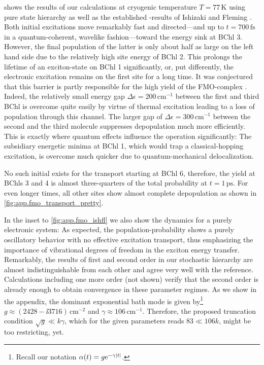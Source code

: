  shows the results of our calculations at cryogenic temperature $T=77\,\mathrm{K}$ using pure state hierarchy as well as the established \HEOM-results of Ishizaki and Fleming \cite{IsFl09_fmo}.
Both initial excitations move remarkably fast and directed---and up to $t=700\,\mathrm{fs}$ in a quantum-coherent, wavelike fashion---toward the energy sink at BChl 3.
However, the final population of the latter is only about half as large on the left hand side due to the relatively high site energy of BChl 2.
This prolongs the lifetime of an exciton-state on BChl 1 significantly, or, put differently, the electronic excitation remains on the first site for a long time.
It was conjectured that this barrier is partly responsible for the high yield of the FMO-complex \cite{IsFl09_fmo}.
Indeed, the relatively small energy gap $\Delta\epsilon = 200\, \mathrm{cm^{-1}}$ between the first and third BChl is overcome quite easily by virtue of thermal excitation leading to a loss of population through this channel.
The larger gap of $\Delta\epsilon = 300\,\mathrm{cm^{-1}}$ between the second and the third molecule suppresses depopulation much more efficiently.
This is exactly where quantum effects influence the operation significantly:
The subsidiary energetic minima at BChl 1, which would trap a classical-hopping excitation, is overcome much quicker due to quantum-mechanical delocalization.

No such initial  exists for the transport starting at BChl 6, therefore, the yield at BChls 3 and 4 is almost three-quarters of the total probability at $t=1\,\mathrm{ps}$.
For even longer times, all other sites show almost complete depopulation as shown in \autoref{fig:app.fmo_transport_pretty}.

In the inset to \autoref{fig:app.fmo_ishfl} we also show the dynamics for a purely electronic system:
As expected, the population-probability shows a purely oscillatory behavior with no effective excitation transport, thus emphasizing the importance of vibrational degrees of freedom in the exciton energy transfer.\\

Remarkably, the results of first and second order in our stochastic hierarchy are almost indistinguishable from each other and agree very well with the reference.
Calculations including one more order (not shown) verify that the second order is already enough to obtain convergence in these parameter regimes.
As we show in the appendix, the dominant exponential bath mode is given by\footnote{%
  Recall our notation $\alpha(t) = g \exp[-\gamma\abs{t}]$.
}
$g \approx (2428 - \ii 3716) \, \mathrm{cm^{-2}}$ and $\gamma \approx 106\,\mathrm{cm^{-1}}$.
Therefore, the proposed truncation condition $\sqrt{g} \ll k \gamma$, which for the given parameters reads $83 \ll 106 k$, might be too restricting, yet.

